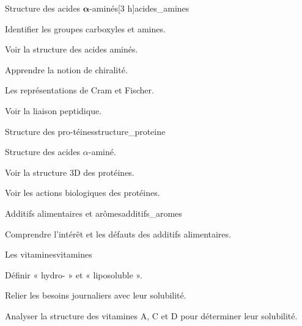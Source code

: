 \begin{multicols}{2}
  \begin{activite}{Structure des acides $\mathbf{\alpha}$-aminés}[3 h]{acides_amines}
    \begin{prerequis}
      \item Identifier les groupes carboxyles et amines.
    \end{prerequis}
    \begin{objectifs}  
      \item Voir la structure des acides aminés.
      \item Apprendre la notion de chiralité.
      \item Les représentations de Cram et Fischer.
      \item Voir la liaison peptidique.
    \end{objectifs}
  \end{activite}

  \begin{activite}{Structure des pro-téines}{structure_proteine}
    \begin{prerequis}
      \item Structure des acides $\alpha$-aminé.
    \end{prerequis}
    \begin{objectifs}
      \item Voir la structure 3D des protéines.
      \item Voir les actions biologiques des protéines.
    \end{objectifs}
  \end{activite}

  \setcounter{activiteNum}{4}
  \begin{activite}{Additifs alimentaires et arômes}{additifs_aromes}
    \begin{objectifs}
      \item Comprendre l'intérêt et les défauts des additifs alimentaires.
    \end{objectifs}
  \end{activite}

  \setcounter{activiteNum}{2}
  \begin{activite}{Les vitamines}{vitamines}
    \begin{objectifs}
      \item Définir « hydro- » et « liposoluble ».
      \item Relier les besoins journaliers avec leur solubilité.
      \item Analyser la structure des vitamines A, C et D pour déterminer leur solubilité.
    \end{objectifs}
  \end{activite}
  

\end{multicols}
